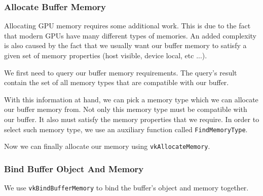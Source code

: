 \begin{minipage}{\linewidth}{\noindent}
    
\end{minipage}

\subsubsection{Allocate Buffer Memory}

Allocating GPU memory requires some additional work.
This is due to the fact that modern GPUs have many different types
of memories.
An added complexity is also caused by the fact that we usually
want our buffer memory to satisfy a given set of memory properties
(host visible, device local, etc ...).

\begin{minipage}{\linewidth}{\noindent}
    
\end{minipage}

We first need to query our buffer memory requirements.
The query's result contain the set of all memory types that are compatible
with our buffer.

With this information at hand, we can pick a memory type which we can
allocate our buffer memory from.
Not only this memory type must be compatible with our buffer.
It also must satisfy the memory properties that we require.
In order to select such memory type, we use an auxiliary function
called \texttt{FindMemoryType}.

\begin{minipage}{\linewidth}{\noindent}
    
\end{minipage}

Now we can finally allocate our memory using \texttt{vkAllocateMemory}.

\subsubsection{Bind Buffer Object And Memory}

We use \texttt{vkBindBufferMemory} to bind the buffer's object and memory together.

